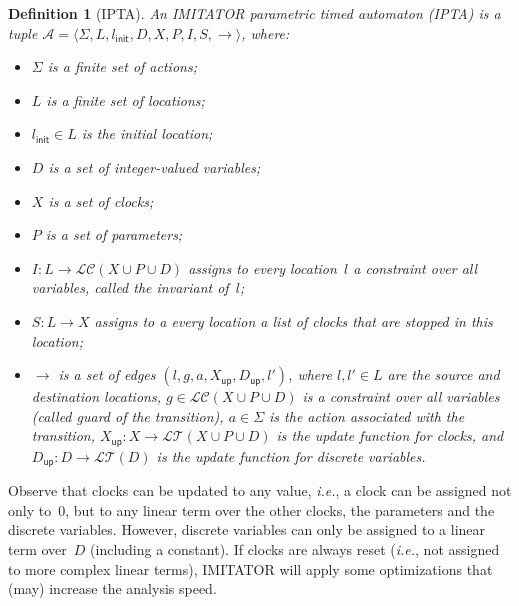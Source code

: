 \documentclass[a4paper,11pt]{report}
\def\init{\ensuremath{\textsf{init}}} %
\newcommand{\A}{\mathcal{A}}
\newcommand{\Action}{\ensuremath{\Sigma}}
\newcommand{\action}{a}
\newcommand{\Clock}{X} %
\newcommand{\Cupdates}{\Clock_\mathsf{up}}
\newcommand{\Dupdates}{\DVar_\mathsf{up}}
\newcommand{\DVar}{D} %
\newcommand{\guard}{g}
\newcommand{\invariant}{I}
\newcommand{\LConstraint}{\mathcal{LC}} %
\newcommand{\LConstraintXPD}{\LConstraint(\Clock \cup \Param \cup \DVar)}
\newcommand{\LTerm}{\mathcal{LT}} %
\newcommand{\LTermD}{\LTerm(\DVar)}
\newcommand{\LTermXPD}{\LTerm(\Clock \cup \Param \cup \DVar)}
\newcommand{\loc}{l} %
\newcommand{\locinit}{\loc_\init}
\newcommand{\Loc}{L} %
\newcommand{\Param}{P} %
\newcommand{\steps}{ {\rightarrow} }
\newcommand{\stopwatches}{S}
\newcommand{\tuple}[1]{\langle#1\rangle}
\newcommand{\imitator}{\textsf{IMITATOR}}
\newcommand{\IPTA}{IPTA}
\newtheorem{definition}{Definition}
\newcommand{\ie}{\textcolor{colorok}{\textit{i.e.}, }}
\begin{document}
\begin{definition}[\IPTA{}]\label{definition:IPTA}
	An \imitator{} parametric timed automaton (\emph{\IPTA{}}) is a tuple $\A = \tuple{\Action, \Loc, \locinit, \DVar, \Clock, \Param, \invariant, \stopwatches, \steps}$, where:
	\begin{itemize}
		\item $\Action$ is a finite set of actions;
		\item $\Loc$ is a finite set of locations;
		\item $\locinit \in \Loc$ is the initial location;
		\item $\DVar$ is a set of integer-valued variables;
		\item $\Clock$ is a set of clocks;
		\item $\Param$ is a set of parameters;
		\item $\invariant : \Loc \rightarrow \LConstraintXPD$ assigns to every location~$\loc$ a constraint over all variables, called the \emph{invariant} of~$\loc$;
		\item $\stopwatches : \Loc \rightarrow \Clock$ assigns to a every location a list of clocks that are stopped in this location;
		\item $\steps$ is a set of edges $(\loc, \guard, \action, \Cupdates, \Dupdates, \loc')$, where
			$\loc, \loc' \in \Loc$ are the source and destination locations,
			$\guard \in \LConstraintXPD$ is a constraint over all variables (called \emph{guard} of the transition),
			$\action\in\Sigma$ is the action associated with the transition,
			$\Cupdates : \Clock \rightarrow \LTermXPD$ is the update function for clocks, and %
			$\Dupdates : \DVar \rightarrow \LTermD$ is the update function for discrete variables. %
	\end{itemize}
\end{definition}

Observe that clocks can be updated to any value, \ie{} a clock can be assigned not only to~0, but to any linear term over the other clocks, the parameters and the discrete variables.
However, discrete variables can only be assigned to a linear term over~$\DVar$ (including a constant).
If clocks are always reset (\ie{} not assigned to more complex linear terms), \imitator{} will apply some optimizations that (may) increase the analysis speed.
\end{document}
